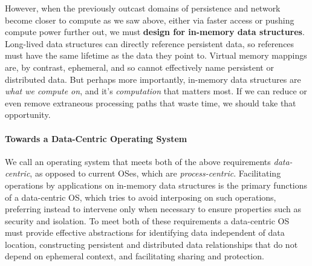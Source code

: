 However, when the previously outcast
domains of persistence and network become closer to compute as we saw above, either via faster access or pushing compute power
further out, we must \textbf{design for in-memory data structures}. Long-lived data structures can directly reference
persistent data, so references must have the same lifetime as the data they point to. Virtual memory mappings are, by
contrast, ephemeral, and so cannot effectively name persistent or distributed data. But perhaps more importantly,
in-memory data structures are \emph{what we compute on}, and it's \emph{computation} that matters most. If we can reduce
or even remove extraneous processing paths that waste time, we should take that opportunity.


\paragraph{Towards a Data-Centric Operating System}
We call an operating system that meets both of the above requirements
\emph{data-centric}, as opposed to current OSes, which are \emph{process-centric}.
Facilitating
operations by applications on in-memory data structures is the primary functions of a data-centric OS,
which tries to avoid interposing on such operations, preferring instead to intervene only when
necessary to ensure properties such as security and isolation. To meet both of these requirements
a data-centric OS must provide effective abstractions for identifying data independent
of data location, constructing persistent and distributed data relationships that do not depend on ephemeral
context, and facilitating sharing and protection.








